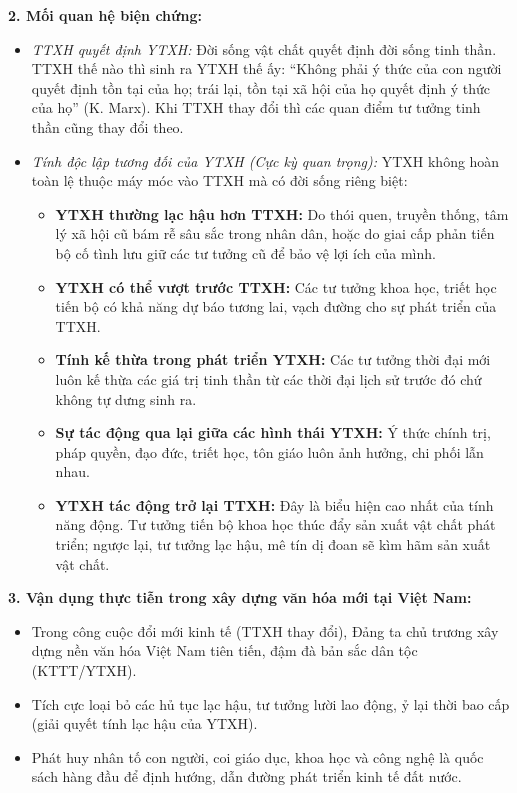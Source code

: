 \documentclass[12pt,a4paper]{article}
\begin{document}
{\noindent
\textbf{2. Mối quan hệ biện chứng:}
\begin{itemize}
    \item \textit{TTXH quyết định YTXH:} Đời sống vật chất quyết định đời sống tinh thần. TTXH thế nào thì sinh ra YTXH thế ấy: ``Không phải ý thức của con người quyết định tồn tại của họ; trái lại, tồn tại xã hội của họ quyết định ý thức của họ'' (K. Marx). Khi TTXH thay đổi thì các quan điểm tư tưởng tinh thần cũng thay đổi theo.
    \item \textit{Tính độc lập tương đối của YTXH (Cực kỳ quan trọng):} YTXH không hoàn toàn lệ thuộc máy móc vào TTXH mà có đời sống riêng biệt:
    \begin{itemize}
        \item \textbf{YTXH thường lạc hậu hơn TTXH:} Do thói quen, truyền thống, tâm lý xã hội cũ bám rễ sâu sắc trong nhân dân, hoặc do giai cấp phản tiến bộ cố tình lưu giữ các tư tưởng cũ để bảo vệ lợi ích của mình.
        \item \textbf{YTXH có thể vượt trước TTXH:} Các tư tưởng khoa học, triết học tiến bộ có khả năng dự báo tương lai, vạch đường cho sự phát triển của TTXH.
        \item \textbf{Tính kế thừa trong phát triển YTXH:} Các tư tưởng thời đại mới luôn kế thừa các giá trị tinh thần từ các thời đại lịch sử trước đó chứ không tự dưng sinh ra.
        \item \textbf{Sự tác động qua lại giữa các hình thái YTXH:} Ý thức chính trị, pháp quyền, đạo đức, triết học, tôn giáo luôn ảnh hưởng, chi phối lẫn nhau.
        \item \textbf{YTXH tác động trở lại TTXH:} Đây là biểu hiện cao nhất của tính năng động. Tư tưởng tiến bộ khoa học thúc đẩy sản xuất vật chất phát triển; ngược lại, tư tưởng lạc hậu, mê tín dị đoan sẽ kìm hãm sản xuất vật chất.
    \end{itemize}
\end{itemize}

\noindent
\textbf{3. Vận dụng thực tiễn trong xây dựng văn hóa mới tại Việt Nam:}
\begin{itemize}
    \item Trong công cuộc đổi mới kinh tế (TTXH thay đổi), Đảng ta chủ trương xây dựng nền văn hóa Việt Nam tiên tiến, đậm đà bản sắc dân tộc (KTTT/YTXH).
    \item Tích cực loại bỏ các hủ tục lạc hậu, tư tưởng lười lao động, ỷ lại thời bao cấp (giải quyết tính lạc hậu của YTXH).
    \item Phát huy nhân tố con người, coi giáo dục, khoa học và công nghệ là quốc sách hàng đầu để định hướng, dẫn đường phát triển kinh tế đất nước.
\end{itemize}

}
\end{document}
